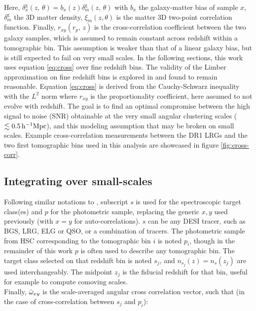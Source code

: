 Here, $\delta_x^{\mathrm{g}}(z,\,\theta)=b_x(z)\delta^{\mathrm{g}}_m(z,\,\theta)$ with $b_x$ the galaxy-matter bias of sample $x$, $\delta^{\mathrm{g}}_m$ the 3D matter density, $\xi_m(z,\theta)$ is the matter 3D two-point correlation function. 
Finally, $r_{xy}(r_p,\, z)$ is the cross-correlation coefficient between the two galaxy samples, which is assumed to remain constant across redshift within a tomographic bin. This assumption is weaker than that of a linear galaxy bias, but is still expected to fail on very small scales. 
In the following sections, this work uses equation \ref{eq:cross} over fine redshift bins. The validity of the Limber approximation \cite{Limber1953Approximation} on fine redshift bins is explored in \cite{McQuinnClusterZ2013} and found to remain reasonable.
Equation \ref{eq:cross} is derived from the Cauchy-Schwarz inequality with the $L^2$ norm where $r_{xy}$ is the proportionality coefficient, here assumed to not evolve with redshift. 
The goal is to find an optimal compromise between the high signal to noise (SNR) obtainable at the very small angular clustering scales ($\lesssim0.5\,\mathrm{h}^{-1}\mathrm{Mpc}$), and this modeling assumption that may be broken on small scales. 
Example cross-correlation measurements between the DR1 LRGs and the two first tomographic bins used in this analysis are showcased in figure \ref{fig:cross-corr}.

\subsection{Integrating over small-scales}
\label{sec:modeling:integration}


Following similar notations to \cite{EuclidClusterRedshifts2025, EuclidClusteringRedshifts2023}, subscript $s$ is used for the spectroscopic target class(es) and $p$ for the photometric sample, replacing the generic $x,y$ used previously (with $x=y$ for auto-correlations). $s$ can be any DESI tracer, such as BGS, LRG, ELG or QSO, or a combination of tracers. The photometric sample from HSC corresponding to the tomographic bin $i$ is noted $p_i$, though in the remainder of this work $p$ is often used to describe any tomographic bin.
The target class selected on that redshift bin is noted $s_j$, and $n_{s_j}(z)=n_s(z_j)$ are used interchangeably. The midpoint $z_j$ is the fiducial redshift for that bin, useful for example to compute comoving scales.\\
Finally, $\bar{\omega}_{xy}$ is the scale-averaged angular cross correlation vector, such that (in the case of cross-correlation between $s_j$ and $p_i$):

